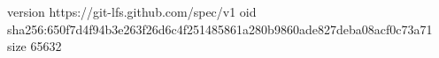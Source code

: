 version https://git-lfs.github.com/spec/v1
oid sha256:650f7d4f94b3e263f26d6c4f251485861a280b9860ade827deba08acf0c73a71
size 65632
